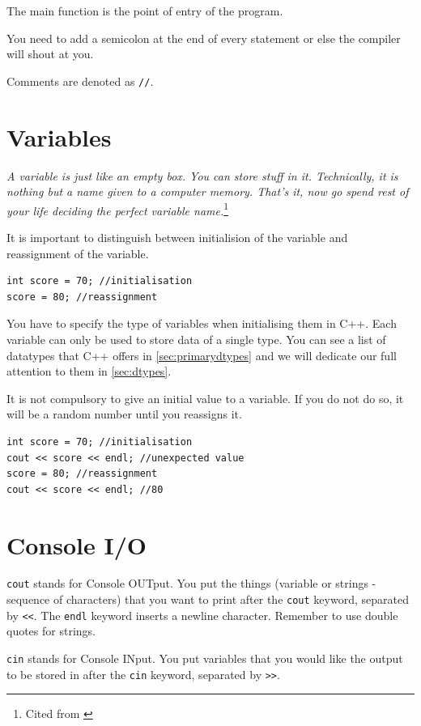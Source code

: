 The main function is the point of entry of the program.

You need to add a semicolon at the end of every statement or else the compiler will shout at you. 

Comments are denoted as \texttt{//}.

\section{Variables}

\textit{A variable is just like an empty box. You can store stuff in it. Technically, it is nothing but a name given to a computer memory. That's it, now go spend rest of your life deciding the perfect variable name.}\footnote{Cited from \cite{variableig}}

It is important to distinguish between initialision of the variable and reassignment of the variable.

\begin{lstlisting}
int score = 70; //initialisation
score = 80; //reassignment
\end{lstlisting}

You have to specify the type of variables when initialising them in C++. Each variable can only be used to store data of a single type. You can see a list of datatypes that C++ offers in \cref{sec:primarydtypes} and we will dedicate our full attention to them in \cref{sec:dtypes}.

It is not compulsory to give an initial value to a variable. If you do not do so, it will be a random number until you reassigns it.

\begin{lstlisting}
int score = 70; //initialisation
cout << score << endl; //unexpected value
score = 80; //reassignment
cout << score << endl; //80
\end{lstlisting}

\section{Console I/O}

\texttt{cout} stands for Console OUTput. You put the things (variable or strings - sequence of characters) that you want to print after the \texttt{cout} keyword, separated by \texttt{<<}. The \texttt{endl} keyword inserts a newline character. Remember to use double quotes for strings.

\texttt{cin} stands for Console INput. You put variables that you would like the output to be stored in after the \texttt{cin} keyword, separated by \texttt{>>}. 

